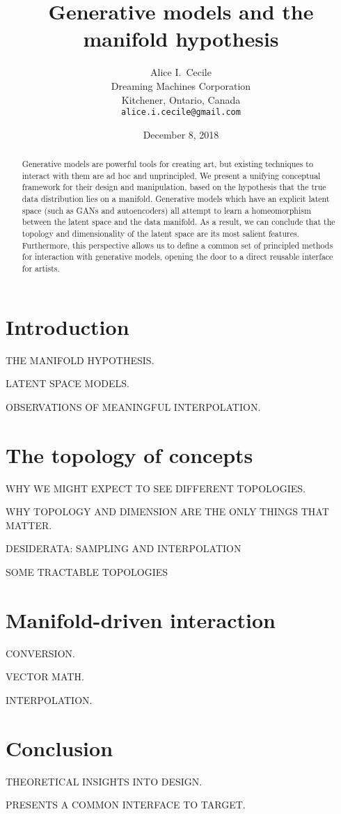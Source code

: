 \documentclass{article}
\title{Generative models and the manifold hypothesis}
\author{Alice I.~Cecile \\
        Dreaming Machines Corporation \\
        Kitchener, Ontario, Canada \\
        \texttt{alice.i.cecile@gmail.com}}
\date{December 8, 2018}
\begin{document}
\maketitle

\begin{abstract}
    Generative models are powerful tools for creating art, but existing techniques to interact with them are ad hoc and unprincipled.
    We present a unifying conceptual framework for their design and manipulation, based on the hypothesis that the true data distribution lies on a manifold.
    Generative models which have an explicit latent space (such as GANs and autoencoders) all attempt to learn a homeomorphism between the latent space and the data manifold.
    As a result, we can conclude that the topology and dimensionality of the latent space are its most salient features.
    Furthermore, this perspective allows us to define a common set of principled methods for interaction with generative models, opening the door to a direct reusable interface for artists.
\end{abstract}

\section{Introduction}

THE MANIFOLD HYPOTHESIS.

LATENT SPACE MODELS.

OBSERVATIONS OF MEANINGFUL INTERPOLATION.

\section{The topology of concepts}

WHY WE MIGHT EXPECT TO SEE DIFFERENT TOPOLOGIES.

WHY TOPOLOGY AND DIMENSION ARE THE ONLY THINGS THAT MATTER.

DESIDERATA: SAMPLING AND INTERPOLATION

SOME TRACTABLE TOPOLOGIES

\section{Manifold-driven interaction}

CONVERSION.

VECTOR MATH.

INTERPOLATION.

\section{Conclusion}

THEORETICAL INSIGHTS INTO DESIGN.

PRESENTS A COMMON INTERFACE TO TARGET.

\end{document}
